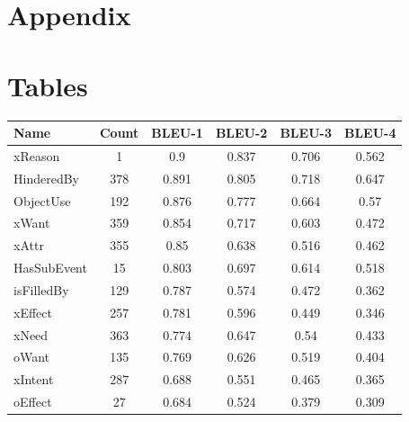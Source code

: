 \appendix

\section*{Appendix}
\section{Tables}

\begin{table}[th]
	\setlength{\tabcolsep}{8.3pt}

	\begin{tabular}{|l|c|c c c c|}
		\hline
		\textbf{Name} & \textbf{Count} & \textbf{BLEU-1} & \textbf{BLEU-2} & \textbf{BLEU-3} & \textbf{BLEU-4} \\
		\hline
		xReason       & 1              & 0.9             & 0.837           & 0.706           & 0.562           \\
		HinderedBy    & 378            & 0.891           & 0.805           & 0.718           & 0.647           \\
		ObjectUse     & 192            & 0.876           & 0.777           & 0.664           & 0.57            \\
		xWant         & 359            & 0.854           & 0.717           & 0.603           & 0.472           \\
		xAttr         & 355            & 0.85            & 0.638           & 0.516           & 0.462           \\
		HasSubEvent   & 15             & 0.803           & 0.697           & 0.614           & 0.518           \\
		isFilledBy    & 129            & 0.787           & 0.574           & 0.472           & 0.362           \\
		xEffect       & 257            & 0.781           & 0.596           & 0.449           & 0.346           \\
		xNeed         & 363            & 0.774           & 0.647           & 0.54            & 0.433           \\
		oWant         & 135            & 0.769           & 0.626           & 0.519           & 0.404           \\
		xIntent       & 287            & 0.688           & 0.551           & 0.465           & 0.365           \\
		oEffect       & 27             & 0.684           & 0.524           & 0.379           & 0.309           \\

\end{tabular}
\end{table}
